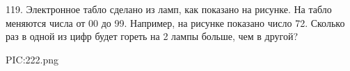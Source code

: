 119. Электронное табло сделано из ламп, как показано на рисунке. На табло меняются числа от 00 до 99. Например, на рисунке показано число 72. Сколько раз в одной из цифр будет гореть на 2 лампы больше, чем в другой?
\begin{center}
{{PIC:222.png}}
\end{center}
